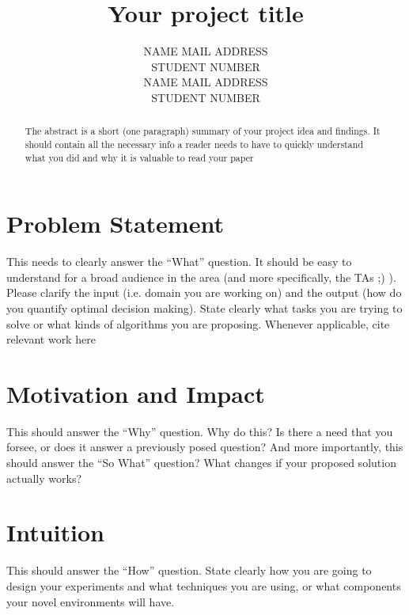 \documentclass[twoside,11pt]{article}
\title{Your project title}
\author{\name NAME \email MAIL ADDRESS \\
       \addr STUDENT NUMBER\\
       \AND
      \name NAME \email MAIL ADDRESS \\
       \addr STUDENT NUMBER}
\begin{document}
\maketitle

\begin{abstract}%
The abstract is a short (one paragraph) summary of your project idea and findings. It should contain all the necessary info a reader needs to have to quickly understand what you did and why it is valuable to read your paper
\end{abstract}

\section{Problem Statement}

    This needs to clearly answer the “What” question.
    It should be easy to understand for a broad audience in the area (and more specifically, the TAs ;) ).
    Please clarify the input (i.e. domain you are working on) and the output (how do you quantify optimal decision making).
    State clearly what tasks you are trying to solve or what kinds of algorithms you are proposing.
    Whenever applicable, cite relevant work here \cite{chow:68,pearl:88,claas}

\section{Motivation and Impact}

    This should answer the “Why” question.
    Why do this? Is there a need that you forsee, or does it answer a previously posed question?
    And more importantly, this should answer the “So What” question? What changes if your proposed solution actually works?

\section{Intuition}

    This should answer the “How” question.
    State clearly how you are going to design your experiments and what techniques you are using, or what components your novel environments will have.






\end{document}
